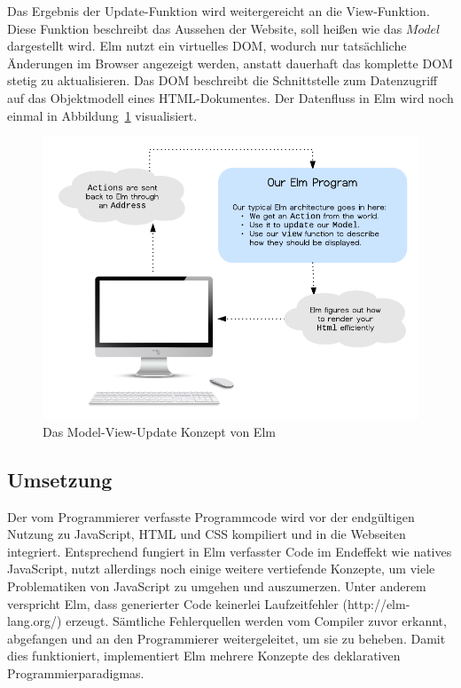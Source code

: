 Das Ergebnis der Update-Funktion wird weitergereicht an die View-Funktion. Diese Funktion beschreibt das Aussehen der Website, soll heißen wie das $Model$ dargestellt wird. Elm nutzt ein virtuelles \ac{DOM}, wodurch nur tatsächliche Änderungen im Browser angezeigt werden, anstatt dauerhaft das komplette \ac{DOM} stetig zu aktualisieren. Das \ac{DOM} beschreibt die Schnittstelle zum Datenzugriff auf das Objektmodell eines \ac{HTML}-Dokumentes.
Der Datenfluss in Elm wird noch einmal in Abbildung~\ref{fig:elm-model-view-update-concept} visualisiert.
\begin{figure}[h]
  \centering  
  \includegraphics[scale=1]{img/elm-model-view-update-concept.png}
  \caption{Das Model-View-Update Konzept von Elm}\label{fig:elm-model-view-update-concept}
\end{figure}


\subsection{Umsetzung}
\label{sec:Umsetzung}
Der vom Programmierer verfasste Programmcode wird vor der endgültigen Nutzung zu JavaScript, \ac{HTML} und \ac{CSS} kompiliert und in die Webseiten integriert. Entsprechend fungiert in Elm verfasster Code im Endeffekt wie natives JavaScript, nutzt allerdings noch einige weitere vertiefende Konzepte, um viele Problematiken von JavaScript zu umgehen und auszumerzen.
Unter anderem verspricht Elm, dass generierter Code keinerlei Laufzeitfehler (http://elm-lang.org/) erzeugt. Sämtliche Fehlerquellen werden vom Compiler zuvor erkannt, abgefangen und an den Programmierer weitergeleitet, um sie zu beheben. Damit dies funktioniert, implementiert Elm mehrere Konzepte des deklarativen Programmierparadigmas.


